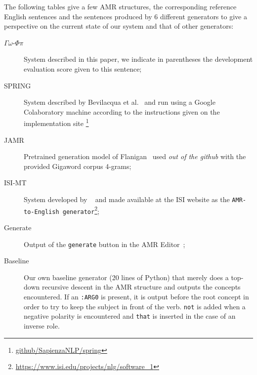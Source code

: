 \documentclass[12pt]{article}
\newcommand{\systeme}[1]{\textsc{#1}}
\newcommand{\gophipy}{$\Gamma\omega$-$\Phi\pi$}
\newcommand{\jamr}{\systeme{JAMR}}
\newcommand{\isimt}{\systeme{ISI-MT}}
\newcommand{\spring}{\systeme{SPRING}}
\newcommand{\representation}[1]{\textsf{#1}}
\newcommand{\AMR}{\representation{AMR}}
\begin{document}
The following tables give a few \AMR{} structures, the corresponding reference English sentences and the sentences produced by 6 different generators to give a perspective on the current state of our system and that of other generators:
\begin{description}
 \item[\gophipy{}] System described in this paper, we indicate in parentheses the development evaluation score given to this sentence;
 \item[\spring{}] System described by Bevilacqua et al.~\cite{bevilacqua-etal-2021-one} and run using a Google Colaboratory machine according to the instructions given on the implementation site \footnote{\url{github/SapienzaNLP/spring}}
 \item[\jamr{}] Pretrained generation model of Flanigan~\cite{DBLP:conf/naacl/FlaniganDSC16} used \emph{out of the github} with the provided Gigaword corpus 4-grams;
 \item[\isimt{}] System developed by ~\cite{DBLP:conf/inlg/PourdamghaniKH16} and made available at the ISI website as the \texttt{AMR-to-English generator}\footnote{\url{https://www.isi.edu/projects/nlg/software_1}};
 \item[Generate] Output of the \texttt{generate} button in the AMR Editor~\cite{AMR-Editor};
 \item[Baseline] Our own baseline generator (20 lines of Python) that merely does a top-down recursive descent in the AMR structure and outputs the concepts encountered. If an \texttt{:ARG0} is present, it is output before the root concept in order to try to keep the subject in front of the verb. \texttt{not} is added when a negative polarity is encountered and \texttt{that} is inserted in the case of an inverse role.
\end{description}
\noindent
\end{document}
